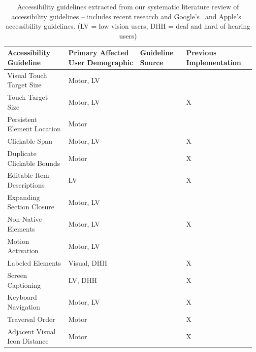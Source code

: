 \begin{table}[h]
	\footnotesize
	\vspace{-0.0em}
	\caption{Accessibility guidelines extracted from our systematic literature review of accessibility guidelines -- includes recent research and Google's~\cite{GoogleAccess} and Apple's~\cite{AppleAccess} accessibility guidelines. (LV = low vision users, DHH = deaf and hard of hearing users)}
	\vspace{-1em}
	\begin{tabular}{>{\centering\arraybackslash}p{2in}|>{\centering\arraybackslash}p{1.8in}|>{\centering\arraybackslash}p{.82in}|>{\centering\arraybackslash}p{.82in}}
	
		\textbf{Accessibility Guideline} & \textbf{Primary Affected User Demographic} & \textbf{Guideline Source}  & \textbf{Previous Implementation} \\
		\hline
		Visual Touch Target Size & \footnotesize {Motor, LV} & \cite{Kong21, Parhi06} &  \\ 
		\rowcolor{gray!30!} Touch Target Size & \footnotesize {Motor, LV} & \cite{AppleAccess, GoogleAccess, HarvardAccess, WebGuide, Nunes15, Calvo16, Alshayban20, Abascal11, Kane11, Kong21} & X \\ 
		Persistent Element Location & \footnotesize {Motor} &\cite{AppleAccess, HarvardAccess, WebGuide, GoogleAccess} &   \\
		\rowcolor{gray!30!} Clickable Span & \footnotesize {Motor, LV} & \cite{Alshayban20} & X \\
		Duplicate Clickable Bounds & \footnotesize {Motor} & \cite{Alshayban20} & X \\
		\rowcolor{gray!30!} Editable Item Descriptions & \footnotesize {LV} & \cite{Alshayban20, Eler18} & X \\
		Expanding Section Closure & \footnotesize {Motor, LV} & \cite{AppleAccess, GoogleAccess, HarvardAccess, WebGuide} &   \\
		\rowcolor{gray!30!} Non-Native Elements & \footnotesize {Motor, LV} & \cite{GoogleAccess, Calvo16}& X \\
		Motion Activation & \footnotesize {Motor, LV} & \cite{AppleAccess, GoogleAccess, HarvardAccess} &  \\
		\rowcolor{gray!30!} Labeled Elements & \footnotesize {Visual, DHH} & \cite{Alshayban20, FlrezAristizbal19, Li21, Eler18} & X \\
		Screen Captioning & \footnotesize {LV, DHH} & \cite{AppleAccess, GoogleAccess, HarvardAccess, WebGuide, ADAWeb, AccessGov, Ross18, Li21, Pavel20, Kane11}& X \\
		\rowcolor{gray!30!}Keyboard Navigation & \footnotesize {Motor, LV} & \cite{ADAWeb, AccessGov, FlrezAristizbal19, Li21, Chiou21} & X \\
		Traversal Order & \footnotesize {Motor} & \cite{AccessGov, Alshayban20, FlrezAristizbal19} & X \\
		\rowcolor{gray!30!}Adjacent Visual Icon Distance & \footnotesize {Motor} & \cite{AppleAccess, GoogleAccess, WebGuide, Yan19, Abascal11, Nunes15} &  X \\
		

\end{tabular}
\end{table}
